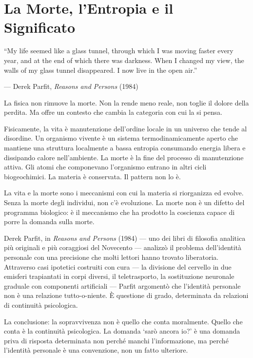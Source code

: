 \documentclass[12pt,a4paper,openany]{book}
\newcommand{\sezione}[1]{\vspace{1.2em}{\large\bfseries #1}\vspace{0.5em}\par}
\begin{document}
\chapter{La Morte, l'Entropia e il Significato}

\epigraph{``My life seemed like a glass tunnel, through which I was moving faster every year, and at the end of which there was darkness. When I changed my view, the walls of my glass tunnel disappeared. I now live in the open air.''}{--- Derek Parfit, \textit{Reasons and Persons} (1984)}

\sezione{La fisica della morte}

La fisica non rimuove la morte. Non la rende meno reale, non toglie il dolore della perdita. Ma offre un contesto che cambia la categoria con cui la si pensa.

Fisicamente, la vita è manutenzione dell'ordine locale in un universo che tende al disordine. Un organismo vivente è un sistema termodinamicamente aperto che mantiene una struttura localmente a bassa entropia consumando energia libera e dissipando calore nell'ambiente. La morte è la fine del processo di manutenzione attiva. Gli atomi che componevano l'organismo entrano in altri cicli biogeochimici. La materia è conservata. Il pattern non lo è.

La vita e la morte sono i meccanismi con cui la materia si riorganizza ed evolve. Senza la morte degli individui, non c'è evoluzione. La morte non è un difetto del programma biologico: è il meccanismo che ha prodotto la coscienza capace di porre la domanda sulla morte.

\sezione{Derek Parfit e la riduzione dell'identità personale}

Derek Parfit, in \textit{Reasons and Persons} (1984) — uno dei libri di filosofia analitica più originali e più coraggiosi del Novecento — analizzò il problema dell'identità personale con una precisione che molti lettori hanno trovato liberatoria. Attraverso casi ipotetici costruiti con cura — la divisione del cervello in due emisferi trapiantati in corpi diversi, il teletrasporto, la sostituzione neuronale graduale con componenti artificiali — Parfit argomentò che l'identità personale non è una relazione tutto-o-niente. È questione di grado, determinata da relazioni di continuità psicologica.

La conclusione: la sopravvivenza non è quello che conta moralmente. Quello che conta è la continuità psicologica. La domanda `sarò ancora io?' è una domanda priva di risposta determinata non perché manchi l'informazione, ma perché l'identità personale è una convenzione, non un fatto ulteriore.
\end{document}

